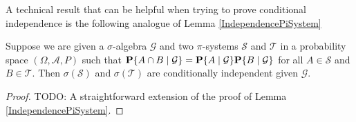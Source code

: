 A technical result that can be helpful when trying to prove
conditional independence is the following analogue of Lemma
\ref{IndependencePiSystem}
\begin{lem}\label{ConditionalIndependencePiSystem}Suppose we are given
  a $\sigma$-algebra $\mathcal{G}$ and two
  $\pi$-systems $\mathcal{S}$ and $\mathcal{T}$ in a probability space
  $(\Omega, \mathcal{A}, P)$ such that
  $\cprobability{\mathcal{G}}{A \cap B} = \cprobability{\mathcal{G}}{A} \cprobability{\mathcal{G}}{B}$ for all
  $A \in \mathcal{S}$ and $B \in \mathcal{T}$.  Then
  $\sigma(\mathcal{S})$ and $\sigma(\mathcal{T})$ are conditionally independent
  given $\mathcal{G}$.
\end{lem}
\begin{proof}
TODO: A straightforward extension of the proof of Lemma
\ref{IndependencePiSystem}.
\end{proof}

